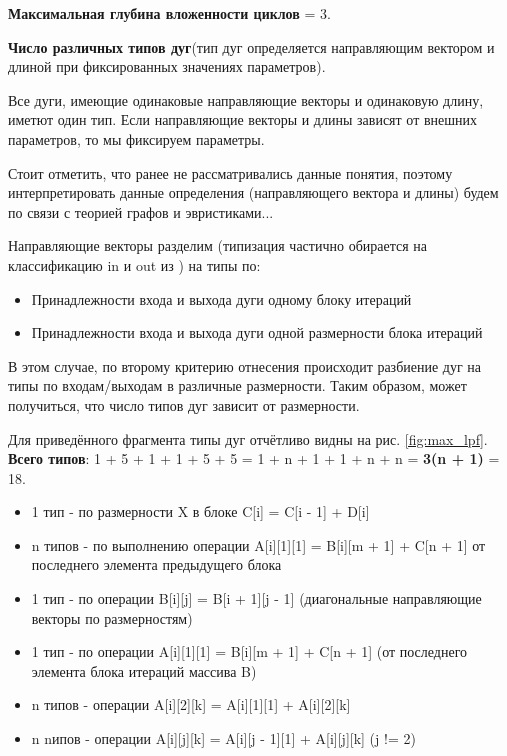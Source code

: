 \documentclass[12pt, fleqn]{article}
\theoremstyle{definition}
\newenvironment{packed_enum}{
\begin{enumerate}
  \setlength{\itemsep}{1pt}
  \setlength{\parskip}{0pt}
  \setlength{\parsep}{0pt}
}{\end{enumerate}}
\begin{document}
\begin{packed_enum}
 \item \textbf{Максимальная глубина вложенности циклов} = 3.

 \item \textbf{Число различных типов дуг}(тип дуг определяется направляющим вектором и длиной при фиксированных значениях параметров).
 
 Все дуги, имеющие одинаковые направляющие векторы и одинаковую длину, иметют один тип. Если направляющие векторы и длины зависят от внешних параметров, то мы фиксируем параметры.
 
 Стоит отметить, что ранее не рассматривались данные понятия, поэтому интерпретировать данные определения (направляющего вектора и длины) будем по связи с теорией графов и эвристиками...
 
 Направляющие векторы разделим (типизация частично обирается на классификацию in и out из \cite{Voevodin02}) на типы по: 
 \begin{itemize}
 \setlength{\itemsep}{1pt}
  \item Принадлежности входа и выхода дуги одному блоку итераций
  \item Принадлежности входа и выхода дуги одной размерности блока итераций
 \end{itemize} 

 
 В этом случае, по второму критерию отнесения происходит разбиение дуг на типы по входам/выходам в различные размерности. Таким образом, может получиться, что число типов дуг зависит от размерности.
 
 Для приведённого фрагмента типы дуг отчётливо видны на рис. \ref{fig:max_lpf}. \textbf{Всего типов}: 1 + 5 + 1 + 1 + 5 + 5 = 1 + n + 1 + 1 + n + n = \textbf{3(n + 1)} = 18.
 
 \begin{itemize}
  \item 1 тип - по размерности X в блоке C[i] = C[i - 1] + D[i]
  \item n типов - по выполнению операции A[i][1][1] = B[i][m + 1] + C[n + 1] от последнего элемента предыдущего блока
  \item 1 тип - по операции B[i][j] = B[i + 1][j - 1] (диагональные направляющие векторы по размерностям)
  \item 1 тип - по операции A[i][1][1] = B[i][m + 1] + C[n + 1] (от последнего элемента блока итераций массива B)
  \item n типов - операции A[i][2][k] = A[i][1][1] + A[i][2][k]
  \item n nипов - операции A[i][j][k] = A[i][j - 1][1] + A[i][j][k] (j != 2)
 \end{itemize}


\end{packed_enum}
\end{document}

